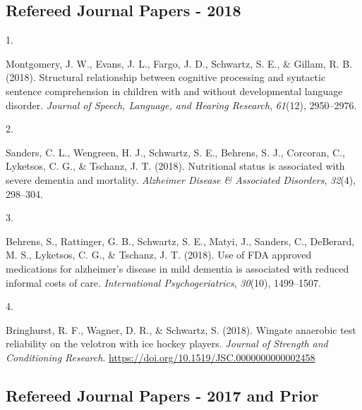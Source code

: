 \documentclass[11pt,a4paper,]{moderncv}
\newlength{\csllabelwidth}
\newcommand{\CSLLeftMargin}[1]{\parbox[t]{\csllabelwidth}{#1}}
\newcommand{\CSLRightInline}[1]{\parbox[t]{\linewidth - \csllabelwidth}{#1}}
\begin{document}
\vspace{7mm}

\hypertarget{refereed-journal-papers---2018}{%
\subsection{\texorpdfstring{\textbf{Refereed Journal Papers -
2018}}{Refereed Journal Papers - 2018}}\label{refereed-journal-papers---2018}}

\hypertarget{refs_journals2018}{}
\leavevmode{}%
\CSLLeftMargin{1. }
\CSLRightInline{Montgomery, J. W., Evans, J. L., Fargo, J. D., Schwartz,
S. E., \& Gillam, R. B. (2018). Structural relationship between
cognitive processing and syntactic sentence comprehension in children
with and without developmental language disorder. \emph{Journal of
Speech, Language, and Hearing Research}, \emph{61}(12), 2950--2976.}

\leavevmode{}%
\CSLLeftMargin{2. }
\CSLRightInline{Sanders, C. L., Wengreen, H. J., Schwartz, S. E.,
Behrens, S. J., Corcoran, C., Lyketsos, C. G., \& Tschanz, J. T. (2018).
Nutritional status is associated with severe dementia and mortality.
\emph{Alzheimer Disease \& Associated Disorders}, \emph{32}(4),
298--304.}

\leavevmode{}%
\CSLLeftMargin{3. }
\CSLRightInline{Behrens, S., Rattinger, G. B., Schwartz, S. E., Matyi,
J., Sanders, C., DeBerard, M. S., Lyketsos, C. G., \& Tschanz, J. T.
(2018). Use of FDA approved medications for alzheimer's disease in mild
dementia is associated with reduced informal costs of care.
\emph{International Psychogeriatrics}, \emph{30}(10), 1499--1507.}

\leavevmode{}%
\CSLLeftMargin{4. }
\CSLRightInline{Bringhurst, R. F., Wagner, D. R., \& Schwartz, S.
(2018). Wingate anaerobic test reliability on the velotron with ice
hockey players. \emph{Journal of Strength and Conditioning Research}.
\url{https://doi.org/10.1519/JSC.0000000000002458}}

\vspace{7mm}

\hypertarget{refereed-journal-papers---2017-and-prior}{%
\subsection{\texorpdfstring{\textbf{Refereed Journal Papers - 2017 and
Prior}}{Refereed Journal Papers - 2017 and Prior}}\label{refereed-journal-papers---2017-and-prior}}
\end{document}
